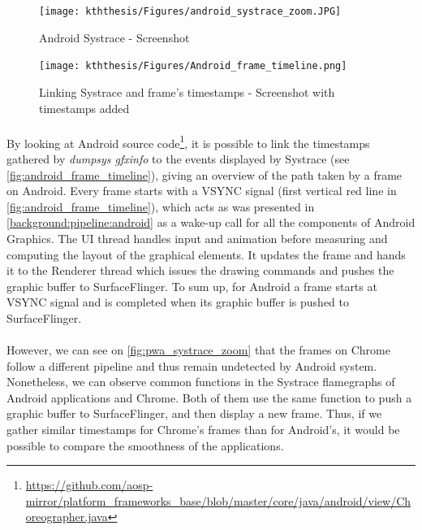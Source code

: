 \documentclass{kththesis}
\begin{document}
    \begin{figure}
        \centering
        \texttt{[image: kththesis/Figures/android\_systrace\_zoom.JPG]}
        \caption{Android Systrace - Screenshot}
        \label{fig:android_systrace_zoom}
    \end{figure}
    
    \begin{figure}[!ht]
        \centering
        \texttt{[image: kththesis/Figures/Android\_frame\_timeline.png]}
        \caption{Linking Systrace and frame's timestamps - Screenshot with timestamps added}
        \label{fig:android_frame_timeline}
    \end{figure}
    
    \paragraph{}
    By looking at Android source code\footnote{\url{https://github.com/aosp-mirror/platform_frameworks_base/blob/master/core/java/android/view/Choreographer.java}}, it is possible to link the timestamps gathered by \textit{dumpsys gfxinfo} to the events displayed by Systrace (see \autoref{fig:android_frame_timeline}), giving an overview of the path taken by a frame on Android. \newline
    \indent Every frame starts with a VSYNC signal (first vertical red line in \autoref{fig:android_frame_timeline}), which acts as was presented in \autoref{background:pipeline:android} as a wake-up call for all the components of Android Graphics. The UI thread handles input and animation before measuring and computing the layout of the graphical elements. It updates the frame and hands it to the Renderer thread which issues the drawing commands and pushes the graphic buffer to SurfaceFlinger. To sum up, for Android a frame starts at VSYNC signal and is completed when its graphic buffer is pushed to SurfaceFlinger.
    
    \paragraph{}
    However, we can see on \autoref{fig:pwa_systrace_zoom} that the frames on Chrome follow a different pipeline and thus remain undetected by Android system. Nonetheless, we can observe common functions in the Systrace flamegraphs of Android applications and Chrome. Both of them use the same function to push a graphic buffer to SurfaceFlinger, and then display a new frame. Thus, if we gather similar timestamps for Chrome's frames than for Android's, it would be possible to compare the smoothness of the applications.
    
\end{document}
